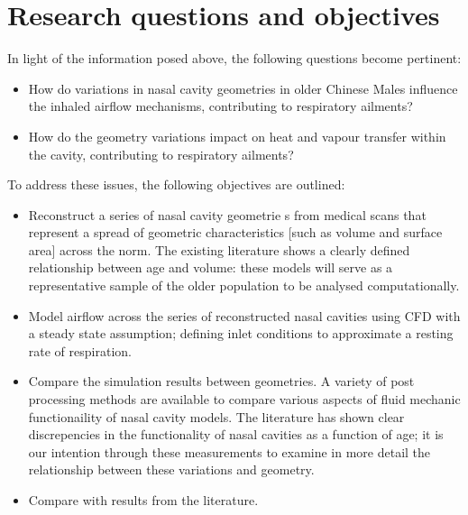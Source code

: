 \section{Research questions and objectives}

In light of the information posed above, the following questions become pertinent:

\begin{itemize}

  \item How do variations in nasal cavity geometries in older Chinese Males influence the inhaled airflow mechanisms, contributing to respiratory ailments?

  \item How do the geometry variations impact on heat and vapour transfer within the cavity, contributing to respiratory ailments?

\end{itemize}

To address these issues, the following objectives are outlined:

\begin{itemize}

  \item Reconstruct a series of nasal cavity geometrie s from medical scans that represent a spread of geometric characteristics [such as volume and surface area] across the norm. The existing literature shows a clearly defined relationship between age and volume: these models will serve as a representative sample of the older population to be analysed computationally.

  \item Model airflow across the series of reconstructed nasal cavities using CFD with a steady state assumption; defining inlet conditions to approximate a resting rate of respiration. 

  \item Compare the simulation results between geometries. A variety of post processing methods are available to compare various aspects of fluid mechanic functionaility of nasal cavity models. The literature has shown clear discrepencies in the functionality of nasal cavities as a function of age; it is our intention through these measurements to examine in more detail the relationship between these variations and geometry.

  \item  Compare with results from the literature. 
\end{itemize}
 
